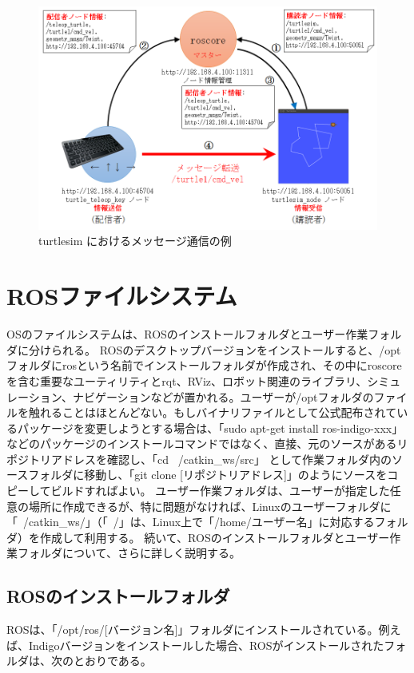 \begin{figure}[h]
  \centering
  \includegraphics[width=\columnwidth]{pictures/chapter3/pic_03_13.png}
  \caption{turtlesim におけるメッセージ通信の例}
\end{figure}

\section{ROSファイルシステム}
OSのファイルシステムは、ROSのインストールフォルダとユーザー作業フォルダに分けられる。
ROSのデスクトップバージョンをインストールすると、/optフォルダにrosという名前でインストールフォルダが作成され、その中にroscoreを含む重要なユーティリティとrqt、RViz、ロボット関連のライブラリ、シミュレーション、ナビゲーションなどが置かれる。ユーザーが/optフォルダのファイルを触れることはほとんどない。もしバイナリファイルとして公式配布されているパッケージを変更しようとする場合は、「sudo apt-get install ros-indigo-xxx」などのパッケージのインストールコマンドではなく、直接、元のソースがあるリポジトリアドレスを確認し、「cd ~/catkin\_ws/src」 として作業フォルダ内のソースフォルダに移動し、「git clone [リポジトリアドレス]」のようにソースをコピーしてビルドすればよい。
ユーザー作業フォルダは、ユーザーが指定した任意の場所に作成できるが、特に問題がなければ、Linuxのユーザーフォルダに「~/catkin\_ws/」（「~/」は、Linux上で「/home/ユーザー名」に対応するフォルダ）を作成して利用する。
続いて、ROSのインストールフォルダとユーザー作業フォルダについて、さらに詳しく説明する。

\subsection{ROSのインストールフォルダ}
ROSは、「/opt/ros/[バージョン名]」フォルダにインストールされている。例えば、Indigoバージョンをインストールした場合、ROSがインストールされたフォルダは、次のとおりである。

